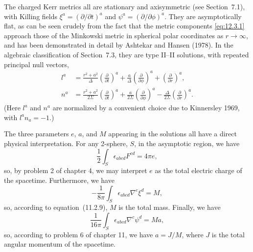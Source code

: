 The charged Kerr metrics all are stationary and axisymmetric (see Section~7.1), with
Killing fields \(\xi^a=(\partial/\partial t)^a\) and
\(\psi^a=(\partial/\partial\phi)^a\). They are asymptotically flat, as can be seen
crudely from the fact that the metric components \eqref{eq:12.3.1} approach those
of the Minkowski metric in spherical polar coordinates as \(r\to\infty\), and has
been demonstrated in detail by Ashtekar and Hansen (1978). In the algebraic
classification of Section~7.3, they are type II--II solutions, with repeated principal
null vectors,
\begin{align}
 l^a&=\frac{r^2+a^2}{\Delta}\left(\frac{\partial}{\partial t}\right)^a+
      \frac a\Delta\left(\frac{\partial}{\partial\phi}\right)^a+
      \left(\frac{\partial}{\partial r}\right)^a, \tag{12.3.5}\label{eq:12.3.5}\\
 n^a&=\frac{r^2+a^2}{2\Sigma}\left(\frac{\partial}{\partial t}\right)^a+
      \frac a{2\Sigma}\left(\frac{\partial}{\partial\phi}\right)^a-
      \frac\Delta{2\Sigma}\left(\frac{\partial}{\partial r}\right)^a .
      \tag{12.3.6}\label{eq:12.3.6}
\end{align}
(Here \(l^a\) and \(n^a\) are normalized by a convenient choice due to Kinnersley
1969, with \(l^an_a=-1\).)

The three parameters \(e\), \(a\), and \(M\) appearing in the solutions all have a
direct physical interpretation. For any 2-sphere, \(S\), in the asymptotic region, we
have
\begin{equation}
 \frac12\int_S\epsilon_{abcd}F^{cd}=4\pi e ,
 \tag{12.3.7}\label{eq:12.3.7}
\end{equation}
so, by problem 2 of chapter 4, we may interpret \(e\) as the total electric charge of
the spacetime. Furthermore, we have
\begin{equation}
 -\frac1{8\pi}\int_S\epsilon_{abcd}\nabla^c\xi^d=M ,
 \tag{12.3.8}\label{eq:12.3.8}
\end{equation}
so, according to equation~(11.2.9), \(M\) is the total mass. Finally, we have
\begin{equation}
 \frac1{16\pi}\int_S\epsilon_{abcd}\nabla^c\psi^d=Ma ,
 \tag{12.3.9}\label{eq:12.3.9}
\end{equation}
so, according to problem 6 of chapter 11, we have \(a=J/M\), where \(J\) is the
total angular momentum of the spacetime.


